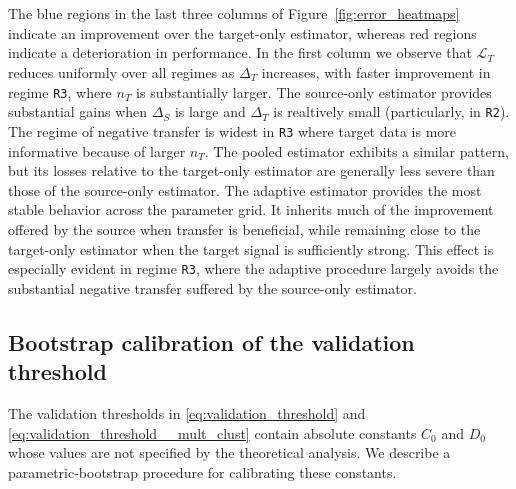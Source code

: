 \documentclass[10pt]{article}
\newcommand{\wh}{\widehat}
\newcommand{\trg}{T}
\newcommand{\nT}{n_{\trg}}
\newcommand{\DeltaT}{\Delta_{\trg}}
\newcommand{\src}{S}
\newcommand{\DeltaS}{\Delta_{\src}}
\begin{document}
The blue regions in the last three columns of Figure~\ref{fig:error_heatmaps} indicate an improvement over the target-only estimator, whereas red regions indicate a deterioration in performance.
In the first column we observe that $\wh{\mathcal L}_\trg$ reduces uniformly over all regimes as $\DeltaT$ increases, with faster improvement in regime \texttt{R3}, where $\nT$ is substantially larger. The source-only estimator provides substantial gains when $\DeltaS$ is large and $\DeltaT$ is realtively small (particularly, in \texttt{R2}). 
The regime of negative transfer is widest in \texttt{R3} where target data is more informative because of larger $\nT$.
The pooled estimator exhibits a similar pattern, but its losses relative to the target-only estimator are generally less severe than those of the source-only estimator. 
The adaptive estimator provides the most stable behavior across the parameter grid. It inherits much of the improvement offered by the source when transfer is beneficial, while remaining close to the target-only estimator when the target signal is sufficiently strong. This effect is especially evident in regime \texttt{R3}, where the adaptive procedure largely avoids the substantial negative transfer suffered by the source-only estimator. 

\subsection{Bootstrap calibration of the validation threshold}
\label{sec:bootstrap_calibration}

The validation thresholds in \eqref{eq:validation_threshold} and \eqref{eq:validation_threshold__mult_clust} contain absolute constants $C_0$ and $D_0$ whose values are not specified by the theoretical analysis. We describe a parametric-bootstrap procedure for calibrating these constants. 
\end{document}
